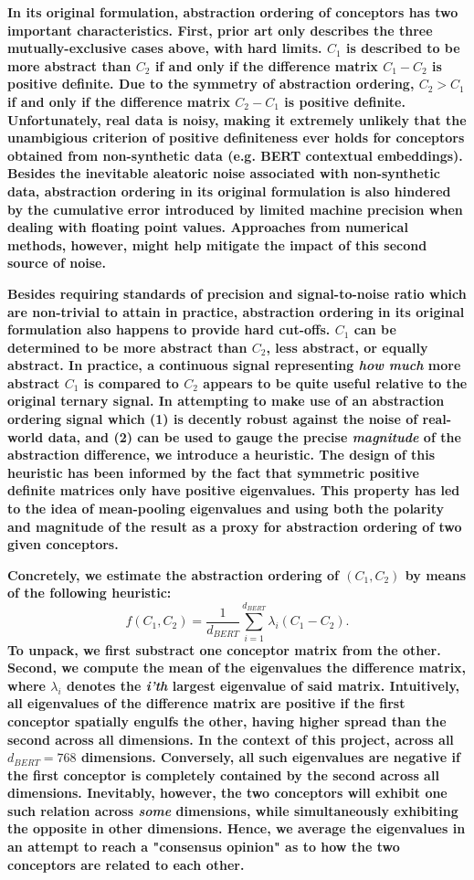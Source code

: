 \textbf{In its original formulation, abstraction ordering of conceptors has two important characteristics. First, prior art only describes the three mutually-exclusive cases above, with hard limits. $C_1$ is described to be more abstract than $C_2$ if and only if the difference matrix $C_1 - C_2$ is positive definite. Due to the symmetry of abstraction ordering, $C_2 > C_1$ if and only if the difference matrix $C_2 - C_1$ is positive definite. Unfortunately, real data is noisy, making it extremely unlikely that the unambigious criterion of positive definiteness ever holds for conceptors obtained from non-synthetic data (e.g. BERT contextual embeddings). Besides the inevitable aleatoric noise associated with non-synthetic data, abstraction ordering in its original formulation is also hindered by the cumulative error introduced by limited machine precision when dealing with floating point values. Approaches from numerical methods, however, might help mitigate the impact of this second source of noise.}

\textbf{Besides requiring standards of precision and signal-to-noise ratio which are non-trivial to attain in practice, abstraction ordering in its original formulation also happens to provide hard cut-offs. $C_1$ can be determined to be more abstract than $C_2$, less abstract, or equally abstract. In practice, a continuous signal representing \textit{how much} more abstract $C_1$ is compared to $C_2$ appears to be quite useful relative to the original ternary signal. In attempting to make use of an abstraction ordering signal which (1) is decently robust against the noise of real-world data, and (2) can be used to gauge the precise \textit{magnitude} of the abstraction difference, we introduce a heuristic. The design of this heuristic has been informed by the fact that symmetric positive definite matrices only have positive eigenvalues. This property has led to the idea of mean-pooling eigenvalues and using both the polarity and magnitude of the result as a proxy for abstraction ordering of two given conceptors.}

\textbf{Concretely, we estimate the abstraction ordering of $(C_1, C_2)$ by means of the following heuristic:$$f(C_1, C_2) = \frac{1}{d_{BERT}} \sum\limits_{i=1}^{d_{BERT}} \lambda_i(C_1 - C_2).$$ To unpack, we first substract one conceptor matrix from the other. Second, we compute the mean of the eigenvalues the difference matrix, where $\lambda_i$ denotes the \textit{i'th} largest eigenvalue of said matrix. Intuitively, all eigenvalues of the difference matrix are positive if the first conceptor spatially engulfs the other, having higher spread than the second across all dimensions. In the context of this project, across all $d_{BERT} = 768$ dimensions. Conversely, all such eigenvalues are negative if the first conceptor is completely contained by the second across all dimensions. Inevitably, however, the two conceptors will exhibit one such relation across \textit{some} dimensions, while simultaneously exhibiting the opposite in other dimensions. Hence, we average the eigenvalues in an attempt to reach a "consensus opinion" as to how the two conceptors are related to each other.}

